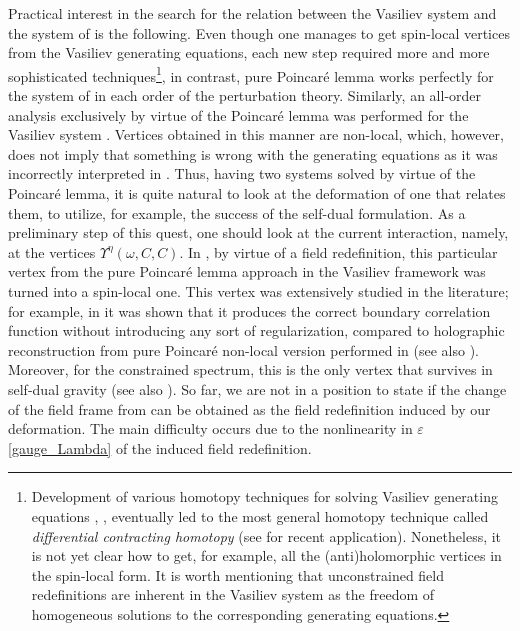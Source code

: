 \documentclass[12pt]{article}
\newcommand{\go}{\omega}
\begin{document}
Practical interest in the search for the relation between the Vasiliev system and the system of \cite{Didenko:2022qga} is the following. Even though one manages to get spin-local vertices from the Vasiliev generating equations, each new step required more and more sophisticated techniques\footnote{Development of various homotopy techniques for solving Vasiliev generating equations \cite{Gelfond:2018vmi}, \cite{Didenko:2018fgx}, \cite{Didenko:2019xzz} eventually led to the most general homotopy technique called {\it differential contracting homotopy} \cite{Vasiliev:2023yzx} (see \cite{Kirakosiants:2025gpd} for recent application). Nonetheless, it is not yet clear how to get, for example, all the (anti)holomorphic vertices in the spin-local form. It is worth mentioning that unconstrained field redefinitions are inherent in the Vasiliev system as the freedom of homogeneous solutions to the corresponding generating equations.}, in contrast, pure Poincaré lemma works perfectly for the system of \cite{Didenko:2022qga} in each order of the perturbation theory. Similarly, an all-order analysis exclusively by virtue of the Poincaré lemma was performed for the Vasiliev system \cite{Didenko:2015cwv}. Vertices obtained in this manner are non-local, which, however, does not imply that something is wrong with the generating equations as it was incorrectly interpreted in \cite{Skvortsov:2015lja}. Thus, having two systems solved by virtue of the Poincaré lemma, it is quite natural to look at the deformation of one that relates them, to utilize, for example, the success of the self-dual formulation. As a preliminary step of this quest, one should look at the current interaction, namely, at the vertices $\Upsilon^{\eta}(\go,C,C)$. In \cite{Vasiliev:2016xui}, by virtue of a field redefinition, this particular vertex from the pure Poincaré lemma approach in the Vasiliev framework was turned into a spin-local one. This vertex was extensively studied in the literature; for example, in \cite{Didenko:2017lsn} it was shown that it produces the correct boundary correlation function without introducing any sort of regularization, compared to holographic reconstruction from pure Poincaré  non-local version performed in \cite{Giombi:2009wh} (see also \cite{Giombi:2010vg}). Moreover, for the constrained spectrum, this is the only vertex that survives in self-dual gravity \cite{Didenko:2026apw} (see also \cite{Vasiliev:1989xz}). So far, we are not in a position to state if the change of the field frame from \cite{Vasiliev:2016xui} can be obtained as the field redefinition induced by our deformation. The main difficulty occurs due to the nonlinearity in $\varepsilon$ \eqref{gauge_Lambda} of the induced field redefinition.
\end{document}
